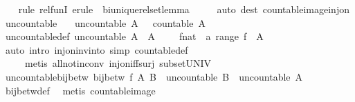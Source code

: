 \begin{isabellebody}
%
\isadelimproof
\ \ %
\endisadelimproof
%
\isatagproof
{}\isamarkupfalse%
\ {\isacharparenleft}rule\ rel{\isacharunderscore}funI{\isacharcomma}\ erule\ {\isacharparenleft}{}{\isacharparenright}\ bi{\isacharunderscore}unique{\isacharunderscore}rel{\isacharunderscore}set{\isacharunderscore}lemma{\isacharparenright}\isanewline
\ \ \ \ \ {\isacharparenleft}auto\ dest{\isacharcolon}\ countable{\isacharunderscore}image{\isacharunderscore}inj{\isacharunderscore}on{\isacharparenright}%
\endisatagproof
{\isafoldproof}%
%
\isadelimproof
%
\endisadelimproof
%
\isadelimdocument
%
\endisadelimdocument
%
\isatagdocument
%
\isamarkuptrue%
%
\endisatagdocument
{\isafolddocument}%
%
\isadelimdocument
%
\endisadelimdocument
{}\isamarkupfalse%
\ uncountable\ \isanewline
\ \ {\isachardoublequoteopen}uncountable\ A\ {\isasymequiv}\ {\isasymnot}\ countable\ A{\isachardoublequoteclose}\isanewline
\isanewline
{}\isamarkupfalse%
\ uncountable{\isacharunderscore}def{\isacharcolon}\ {\isachardoublequoteopen}uncountable\ A\ {\isasymlongleftrightarrow}\ A\ {\isasymnoteq}\ {\isacharbraceleft}{\isacharbraceright}\ {\isasymand}\ {\isasymnot}\ {\isacharparenleft}{\isasymexists}f{\isacharcolon}{\isacharcolon}{\isacharparenleft}nat\ {\isasymRightarrow}\ {\isacharprime}a{\isacharparenright}{\isachardot}\ range\ f\ {\isacharequal}\ A{\isacharparenright}{\isachardoublequoteclose}\isanewline
%
\isadelimproof
\ \ %
\endisadelimproof
%
\isatagproof
{}\isamarkupfalse%
\ {\isacharparenleft}auto\ intro{\isacharcolon}\ inj{\isacharunderscore}on{\isacharunderscore}inv{\isacharunderscore}into\ simp{\isacharcolon}\ countable{\isacharunderscore}def{\isacharparenright}\isanewline
\ \ \ \ \ {\isacharparenleft}metis\ all{\isacharunderscore}not{\isacharunderscore}in{\isacharunderscore}conv\ inj{\isacharunderscore}on{\isacharunderscore}iff{\isacharunderscore}surj\ subset{\isacharunderscore}UNIV{\isacharparenright}%
\endisatagproof
{\isafoldproof}%
%
\isadelimproof
\isanewline
%
\endisadelimproof
\isanewline
{}\isamarkupfalse%
\ uncountable{\isacharunderscore}bij{\isacharunderscore}betw{\isacharcolon}\ {\isachardoublequoteopen}bij{\isacharunderscore}betw\ f\ A\ B\ {\isasymLongrightarrow}\ uncountable\ B\ {\isasymLongrightarrow}\ uncountable\ A{\isachardoublequoteclose}\isanewline
%
\isadelimproof
\ \ %
\endisadelimproof
%
\isatagproof
{}\isamarkupfalse%
\ bij{\isacharunderscore}betw{\isacharunderscore}def\ \isamarkupfalse%
\ {\isacharparenleft}metis\ countable{\isacharunderscore}image{\isacharparenright}%

\end{isabellebody}
